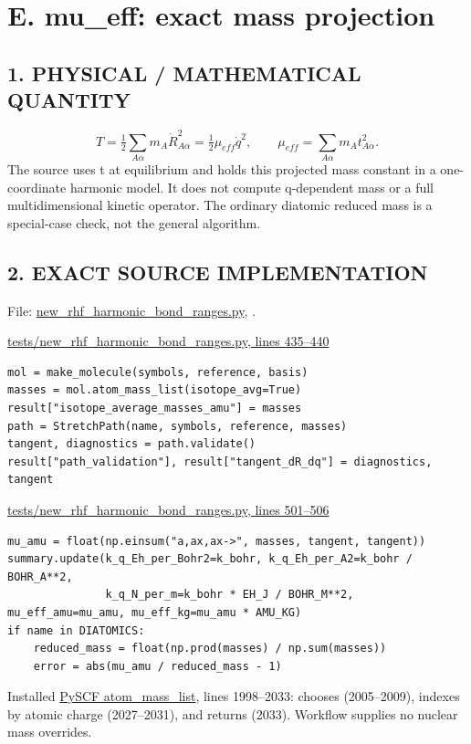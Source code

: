 \documentclass[10pt,a4paper]{article}
\begin{document}
\clearpage
\section{E. mu\_eff: exact mass projection}
\subsection{1. PHYSICAL / MATHEMATICAL QUANTITY}
\[
T=\tfrac12\sum_{A\alpha}m_A\dot R_{A\alpha}^2
=\tfrac12\mu_{eff}\dot q^2,\qquad
\mu_{eff}=\sum_{A\alpha}m_At_{A\alpha}^2.
\]
The source uses t at equilibrium and holds this projected mass constant in a one-coordinate harmonic model. It does not compute q-dependent mass or a full multidimensional kinetic operator. The ordinary diatomic reduced mass is a special-case check, not the general algorithm.

\subsection{2. EXACT SOURCE IMPLEMENTATION}
File: \href{/Users/novaz/Desktop/qml2.0/tests/new\_rhf\_harmonic\_bond\_ranges.py:435}{new\_rhf\_harmonic\_bond\_ranges.py}, .

\href{/Users/novaz/Desktop/qml2.0/tests/new\_rhf\_harmonic\_bond\_ranges.py:435}{tests/new\_rhf\_harmonic\_bond\_ranges.py, lines 435–440}

\begin{Verbatim}
mol = make_molecule(symbols, reference, basis)
masses = mol.atom_mass_list(isotope_avg=True)
result["isotope_average_masses_amu"] = masses
path = StretchPath(name, symbols, reference, masses)
tangent, diagnostics = path.validate()
result["path_validation"], result["tangent_dR_dq"] = diagnostics, tangent
\end{Verbatim}
\href{/Users/novaz/Desktop/qml2.0/tests/new\_rhf\_harmonic\_bond\_ranges.py:501}{tests/new\_rhf\_harmonic\_bond\_ranges.py, lines 501–506}

\begin{Verbatim}
mu_amu = float(np.einsum("a,ax,ax->", masses, tangent, tangent))
summary.update(k_q_Eh_per_Bohr2=k_bohr, k_q_Eh_per_A2=k_bohr / BOHR_A**2,
               k_q_N_per_m=k_bohr * EH_J / BOHR_M**2, mu_eff_amu=mu_amu, mu_eff_kg=mu_amu * AMU_KG)
if name in DIATOMICS:
    reduced_mass = float(np.prod(masses) / np.sum(masses))
    error = abs(mu_amu / reduced_mass - 1)
\end{Verbatim}
Installed \href{/Users/novaz/Desktop/qml2.0/.venv-rhf/lib/python3.13/site-packages/pyscf/gto/mole.py:1998}{PySCF atom\_mass\_list}, lines 1998–2033:  chooses  (2005–2009), indexes by atomic charge (2027–2031), and returns  (2033). Workflow  supplies no nuclear mass overrides.
\end{document}
